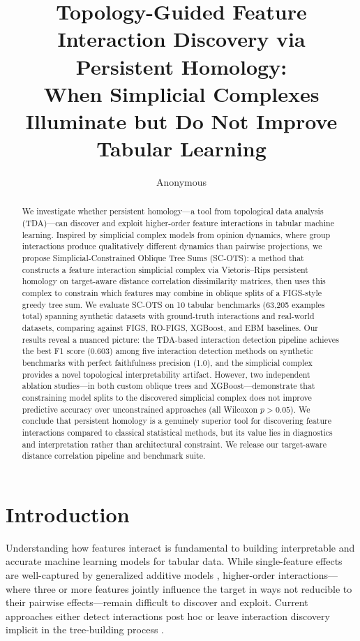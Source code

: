 \documentclass[11pt,letterpaper]{article}
\title{Topology-Guided Feature Interaction Discovery via Persistent Homology:\\When Simplicial Complexes Illuminate but Do Not Improve Tabular Learning}
\author{Anonymous}
\date{}
\begin{document}
\maketitle

\begin{abstract}
We investigate whether persistent homology---a tool from topological data analysis (TDA)---can discover and exploit higher-order feature interactions in tabular machine learning.
Inspired by simplicial complex models from opinion dynamics, where group interactions produce qualitatively different dynamics than pairwise projections, we propose Simplicial-Constrained Oblique Tree Sums (SC-OTS): a method that constructs a feature interaction simplicial complex via Vietoris--Rips persistent homology on target-aware distance correlation dissimilarity matrices, then uses this complex to constrain which features may combine in oblique splits of a FIGS-style greedy tree sum.
We evaluate SC-OTS on 10 tabular benchmarks (63,205 examples total) spanning synthetic datasets with ground-truth interactions and real-world datasets, comparing against FIGS, RO-FIGS, XGBoost, and EBM baselines.
Our results reveal a nuanced picture: the TDA-based interaction detection pipeline achieves the best F1 score (0.603) among five interaction detection methods on synthetic benchmarks with perfect faithfulness precision (1.0), and the simplicial complex provides a novel topological interpretability artifact.
However, two independent ablation studies---in both custom oblique trees and XGBoost---demonstrate that constraining model splits to the discovered simplicial complex does not improve predictive accuracy over unconstrained approaches (all Wilcoxon $p > 0.05$).
We conclude that persistent homology is a genuinely superior tool for discovering feature interactions compared to classical statistical methods, but its value lies in diagnostics and interpretation rather than architectural constraint.
We release our target-aware distance correlation pipeline and benchmark suite.
\end{abstract}

\section{Introduction}
\label{sec:introduction}

Understanding how features interact is fundamental to building interpretable and accurate machine learning models for tabular data. While single-feature effects are well-captured by generalized additive models \citep{Lou2013, Caruana2015}, higher-order interactions---where three or more features jointly influence the target in ways not reducible to their pairwise effects---remain difficult to discover and exploit. Current approaches either detect interactions post hoc \citep{Lundberg2017, Tsang2020} or leave interaction discovery implicit in the tree-building process \citep{Breiman2001, Chen2016}.
\end{document}
